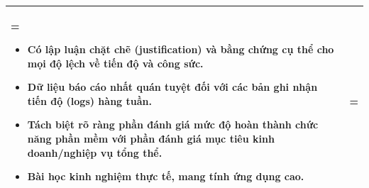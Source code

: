 \begin{table}[H]
\begin{tabularx}{\textwidth}{|>{\hsize=0.5\hsize\linewidth=\hsize\bfseries}X|>{\hsize=1.5\hsize\linewidth=\hsize}X|}
        \begin{itemize}[leftmargin=*, nosep]
            \item Có lập luận chặt chẽ (justification) và bằng chứng cụ thể cho mọi độ lệch về tiến độ và công sức.
            \item Dữ liệu báo cáo nhất quán tuyệt đối với các bản ghi nhận tiến độ (logs) hàng tuần.
            \item Tách biệt rõ ràng phần đánh giá mức độ hoàn thành chức năng phần mềm với phần đánh giá mục tiêu kinh doanh/nghiệp vụ tổng thể.
            \item Bài học kinh nghiệm thực tế, mang tính ứng dụng cao.
        \end{itemize}
        \vspace{-1em} \\
        \hline
    \end{tabularx}
\end{table}

